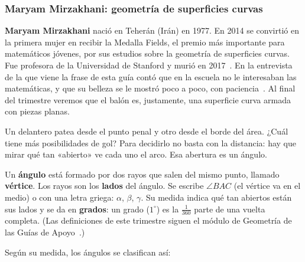 \documentclass[11pt]{article}
\begin{document}
\subsubsection*{Maryam Mirzakhani: geometría de superficies curvas}

\textbf{Maryam Mirzakhani} nació en Teherán (Irán) en 1977. En 2014 se convirtió en la primera
mujer en recibir la Medalla Fields, el premio más importante para matemáticos jóvenes, por sus
estudios sobre la geometría de superficies curvas. Fue profesora de la Universidad de Stanford
y murió en 2017~\cite{mactutormirzakhani}. En la entrevista de la que viene la frase de esta
guía contó que en la escuela no le interesaban las matemáticas, y que su belleza se le mostró
poco a poco, con paciencia~\cite{clay2008}. Al final del trimestre veremos que el balón es,
justamente, una superficie curva armada con piezas planas.

\label{tema:angulos}

\begin{hilo}
Un delantero patea desde el punto penal y otro desde el borde del área. ¿Cuál tiene más
posibilidades de gol? Para decidirlo no basta con la distancia: hay que mirar qué tan
«abierto» ve cada uno el arco. Esa abertura es un ángulo.
\end{hilo}

\begin{definicion}[Ángulo]
Un \textbf{ángulo} está formado por dos rayos que salen del mismo punto, llamado
\textbf{vértice}. Los rayos son los \textbf{lados} del ángulo. Se escribe $\angle BAC$ (el
vértice va en el medio) o con una letra griega: $\alpha$, $\beta$, $\gamma$. Su medida indica
qué tan abiertos están sus lados y se da en \textbf{grados}: un grado ($1^\circ$) es la
$\frac{1}{360}$ parte de una vuelta completa. (Las definiciones de este trimestre siguen el
módulo de Geometría de las Guías de Apoyo~\cite{modulo}.)
\end{definicion}

Según su medida, los ángulos se clasifican así:

\begin{center}
\end{center}
\end{document}
